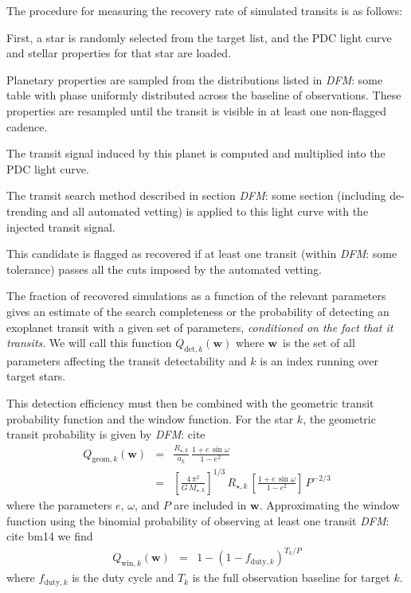 \documentclass[manuscript, letterpaper]{aastex6}
\newcommand{\bvec}[1]{{\ensuremath{\boldsymbol{#1}}}}
\newcommand{\todo}[3]{{\color{#2}\emph{#1}: #3}}
\newcommand{\dfmtodo}[1]{\todo{DFM}{red}{#1}}
\newcommand{\params}{{\ensuremath{\bvec{w}}}}
\begin{document}
The procedure for measuring the recovery rate of simulated transits is as
follows:
\begin{enumerate}
{\item First, a star is randomly selected from the target list, and the PDC
light curve and stellar properties for that star are loaded.}
{\item Planetary properties are sampled from the distributions listed in
\dfmtodo{some table} with phase uniformly distributed across the baseline of
observations. These properties are resampled until the transit is visible in
at least one non-flagged cadence.}
{\item The transit signal induced by this planet is computed and multiplied
into the PDC light curve.}
{\item The transit search method described in section \dfmtodo{some section}
(including de-trending and all automated vetting) is applied to this light
curve with the injected transit signal.}
{\item This candidate is flagged as recovered if at least one transit (within
\dfmtodo{some tolerance}) passes all the cuts imposed by the automated
vetting.}
\end{enumerate}

The fraction of recovered simulations as a function of the relevant parameters
gives an estimate of the search completeness or the probability of detecting
an exoplanet transit with a given set of parameters, \emph{conditioned on the
fact that it transits}.
We will call this function $Q_{\mathrm{det},k}(\params)$ where \params\ is the
set of all parameters affecting the transit detectability and $k$ is an index
running over target stars.

This detection efficiency must then be combined with the geometric transit
probability function and the window function.
For the star $k$, the geometric transit probability is given by \dfmtodo{cite}
\begin{eqnarray}
Q_{\mathrm{geom},k} (\params) &=& \frac{R_{\star,k}}{a_k}
    \, \frac{1 + e\,\sin\omega}{1-e^2} \\
&=& \left[\frac{4\,\pi^2}{G\,M_{\star,k}}\right]^{1/3}\,R_{\star,k}
    \, \left[\frac{1 + e\,\sin \omega}{1-e^2}\right]
    \, P^{-2/3}
\end{eqnarray}
where the parameters $e$, $\omega$, and $P$ are included in \params.
Approximating the window function using the binomial probability of observing
at least one transit \dfmtodo{cite bm14} we find
\begin{eqnarray}
Q_{\mathrm{win},k} (\params) &=& 1 - (1 - f_{\mathrm{duty},k})^{T_k/P}
\end{eqnarray}
where $f_{\mathrm{duty},k}$ is the duty cycle and $T_k$ is the full
observation baseline for target $k$.
\end{document}
